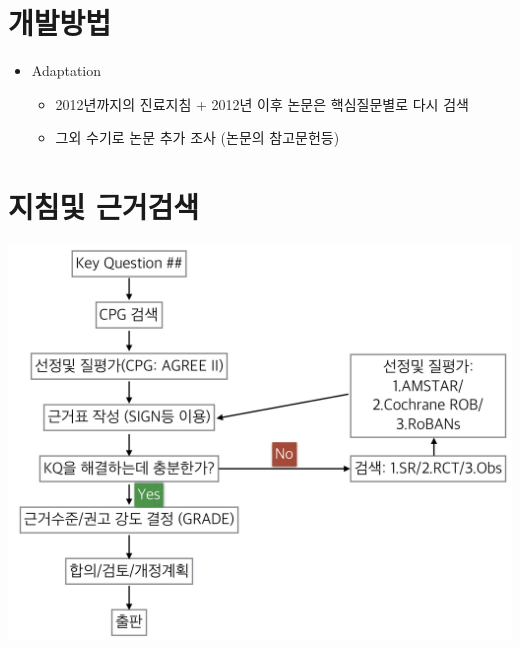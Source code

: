 \documentclass[]{book}
\begin{document}
\hypertarget{section-41}{%
\section*{개발방법}\label{section-41}}

\begin{itemize}
\item
  Adaptation

  \begin{itemize}
  \item
    2012년까지의 진료지침 + 2012년 이후 논문은 핵심질문별로 다시 검색
  \item
    그외 수기로 논문 추가 조사 (논문의 참고문헌등)
  \end{itemize}
\end{itemize}

\hypertarget{section-42}{%
\section*{지침및 근거검색}\label{section-42}}

\includegraphics{static/SearchProcess.png}
\end{document}
